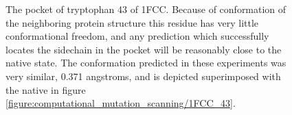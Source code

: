 \begin{figure}
\begin{subfigure}[b]{0.3\textwidth}
        \caption{}
        \label{figure:mutation_side_chain_images/in_pocket_in_plane.png}
    \end{subfigure}
    \caption{The pocket of tryptophan 43 of 1FCC.  
Because of conformation of the neighboring protein structure this residue has very little conformational freedom, and any prediction which successfully locates the sidechain in the pocket will be reasonably close to the native state.
The conformation predicted in these experiments was very similar, 0.371 angstroms, and is depicted superimposed with the native in figure \protect\ref{figure:computational_mutation_scanning/1FCC_43}.}
    \label{figure:1fcc_43_pocket}
\end{figure}


